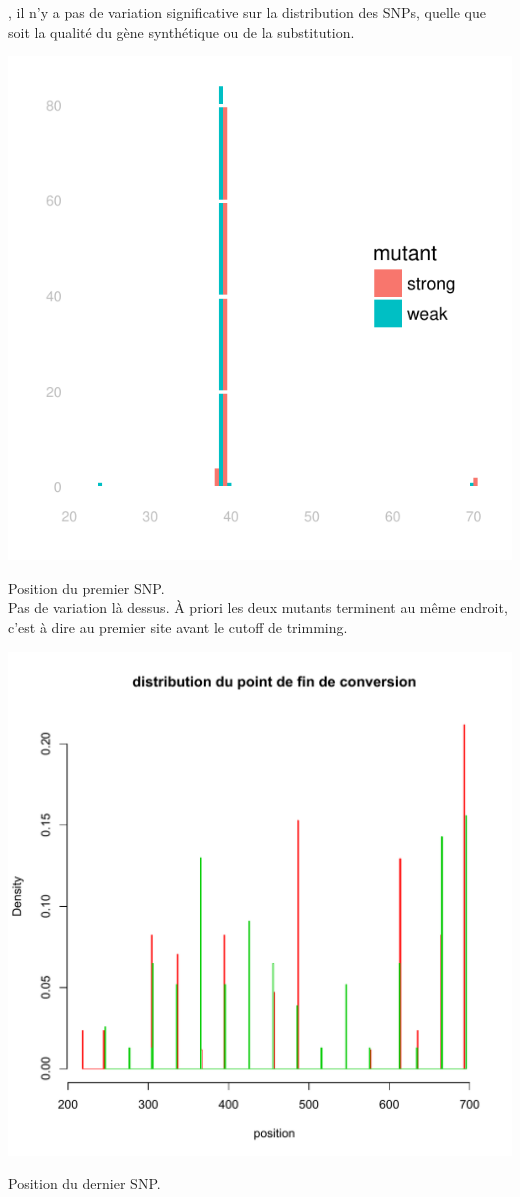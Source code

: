 \documentclass[a4paper]{tufte-handout}
\begin{document}
\newpage

, il n'y a pas de variation significative sur la
distribution des SNPs, quelle que soit la qualité du gène synthétique ou de la
substitution.

\begin{marginfigure}
  \includegraphics[width=\linewidth]{../end_switch.pdf}
  \caption{Position du premier SNP.\\
    Pas de variation là dessus. À priori les deux mutants terminent au même
    endroit, c'est à dire au premier site avant le cutoff de trimming. 
  }
\end{marginfigure}


\begin{marginfigure}
  \includegraphics[width=\linewidth]{../vincent_plot.pdf}
  \caption{Position du dernier SNP.
  }
  \label{figvincent}
\end{marginfigure}
\end{document}
